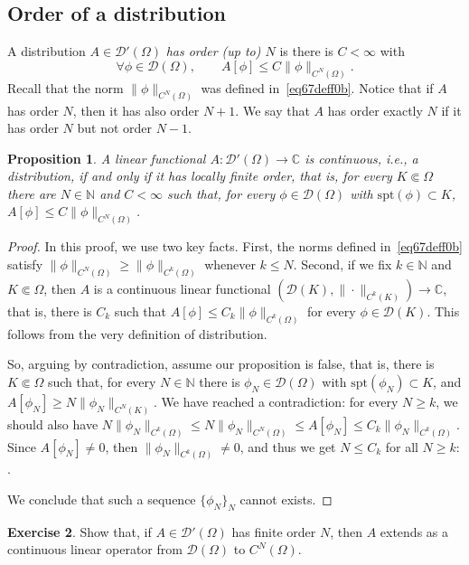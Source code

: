 \documentclass[a4paper,9pt]{amsart}
\newcommand{\scr}[1]{\mathscr{#1}}
\newcommand{\N}{\mathbb{N}}	%
\newcommand{\C}{\mathbb{C}}	%
\newcommand{\spt}{\mathrm{spt}}
\theoremstyle{plain}
\newtheorem{proposition}{Proposition}[section]
\theoremstyle{definition}
\newtheorem{exercise}[proposition]{Exercise}%
\theoremstyle{remark}
\begin{document}
\subsection{Order of a distribution}\label{subs67defb33}
A distribution $A\in\scr D'(\Omega)$ \emph{has order (up to) $N$} is there is $C<\infty$ with
\begin{equation}
	\forall \phi\in\scr D(\Omega),\qquad
	A[\phi] \le C \|\phi\|_{C^N(\Omega)} .
\end{equation}
Recall that the norm $\|\phi\|_{C^N(\Omega)}$ was defined in~\eqref{eq67deff0b}.
Notice that if $A$ has order $N$, then it has also order $N+1$.
We say that $A$ has order exactly $N$ if it has order $N$ but not order $N-1$.

\begin{proposition}\label{prop67defc54}
	A linear functional $A:\scr D'(\Omega)\to\C$ is continuous, i.e., a distribution,
	if and only if it has locally finite order, that is, for every $K\Subset\Omega$ there are $N\in\N$ and $C<\infty$ such that, for every $\phi\in\scr D(\Omega)$ with $\spt(\phi)\subset K$, $A[\phi]\le C\|\phi\|_{C^N(\Omega)}$.
\end{proposition}
\begin{proof}
	In this proof, we use two key facts.
	First, the norms defined in~\eqref{eq67deff0b} satisfy 
	$\|\phi\|_{C^N(\Omega)} \ge \|\phi\|_{C^k(\Omega)}$ whenever $k\le N$.
	Second, if we fix $k\in\N$ and $K\Subset\Omega$, then $A$ is a continuous linear functional $(\scr D(K) , \|\cdot \|_{C^k(K)}) \to\C$,
	that is, there is $C_k$ such that $A[\phi]\le C_k\|\phi\|_{C^k(\Omega)}$ for every $\phi\in\scr D(K)$.
	This follows from the very definition of distribution.
	
	So, arguing by contradiction, assume our proposition is false,
	that is, there is $K\Subset\Omega$ such that, for every $N\in\N$ there is $\phi_N\in\scr D(\Omega)$ with $\spt(\phi_N)\subset K$, and $A[\phi_N]\ge N\|\phi_N\|_{C^N(K)}$.
	We have reached a contradiction: for every $N\ge k$, we should also have 
	$N\|\phi_N\|_{C^k(\Omega)} \le N\|\phi_N\|_{C^N(\Omega)} \le A[\phi_N] \le C_k \|\phi_N\|_{C^k(\Omega)}$.
	Since $A[\phi_N]\neq0$, then $\|\phi_N\|_{C^k(\Omega)}\neq0$,
	and thus we get $N\le C_k$ for all $N\ge k$: \Lightning.
	
	We conclude that such a sequence $\{\phi_N\}_N$ cannot exists.
\end{proof}

\begin{exercise}
	Show that, if $A\in\scr D'(\Omega)$ has finite order $N$, then $A$ extends as a continuous linear operator from $\scr D(\Omega)$ to $C^N(\Omega)$.
\end{exercise}
\end{document}
